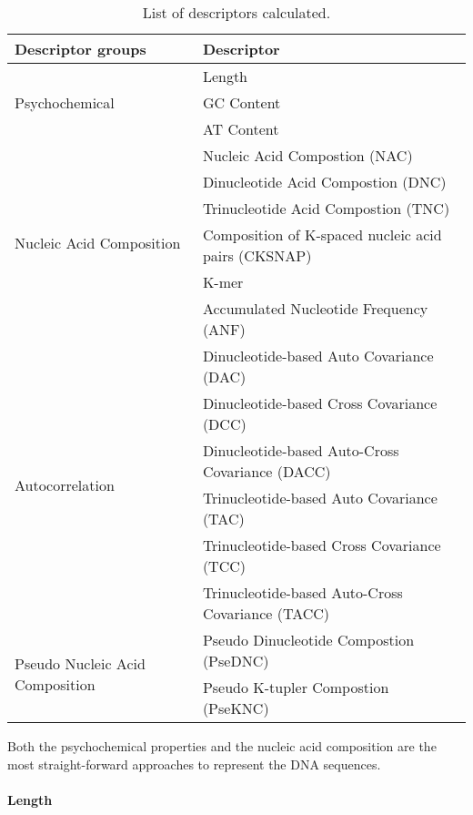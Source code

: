 \begin{table}[ht]
	\caption{List of descriptors calculated.}
	\label{tab:descriptors_classes}
    \centering
    \begin{tabular}{ll}
    	\toprule
    	\textbf{Descriptor groups} & \textbf{Descriptor} \\\midrule
    	
    	\multirow{3}{*}{Psychochemical} & Length \\
    	& GC Content\\
    	& AT Content\\\midrule
    	
    	\multirow{6}{*}{Nucleic Acid Composition} & Nucleic Acid Compostion (NAC) \\
    	
    	& Dinucleotide Acid Compostion (DNC)\\
    	& Trinucleotide Acid Compostion (TNC)\\
    	& Composition of K-spaced nucleic acid pairs (CKSNAP)\\
    	& K-mer\\
    	& Accumulated Nucleotide Frequency (ANF)\\\midrule
    	
    	\multirow{6}{*}{Autocorrelation} & Dinucleotide-based Auto Covariance (DAC) \\
    	& Dinucleotide-based Cross Covariance (DCC)\\
    	& Dinucleotide-based Auto-Cross Covariance (DACC)\\
    	& Trinucleotide-based Auto Covariance (TAC) \\
    	& Trinucleotide-based Cross Covariance (TCC) \\
    	& Trinucleotide-based Auto-Cross Covariance (TACC)\\\midrule
    	
    	\multirow{2}{*}{Pseudo Nucleic Acid Composition} & Pseudo Dinucleotide Compostion (PseDNC) \\
    	& Pseudo K-tupler Compostion (PseKNC) \\
    	
        
    	\bottomrule
    \end{tabular}
\end{table}

Both the psychochemical properties and the nucleic acid composition are the most straight-forward approaches to represent the DNA sequences.

\paragraph{Length}

